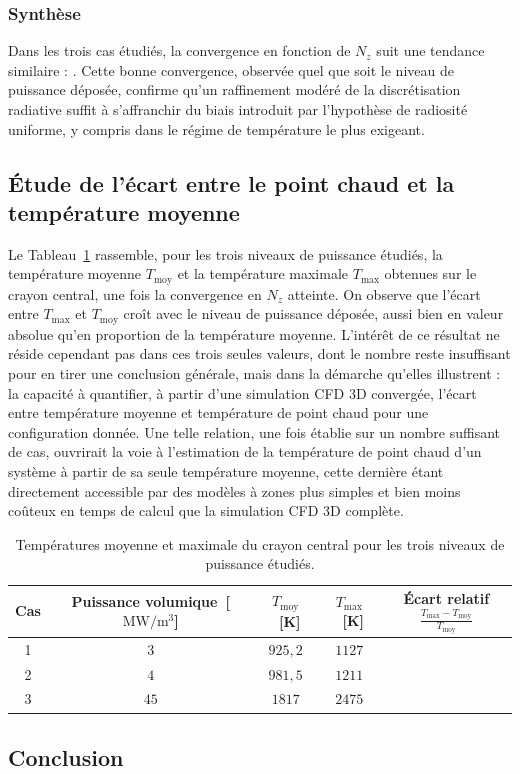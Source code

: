 \subsubsection*{Synthèse}

Dans les trois cas étudiés, la convergence en fonction de $N_z$ suit une tendance similaire : . Cette bonne convergence, observée quel que soit le niveau de puissance déposée, confirme qu'un raffinement modéré de la discrétisation radiative suffit à s'affranchir du biais introduit par l'hypothèse de radiosité uniforme, y compris dans le régime de température le plus exigeant.

\subsection{Étude de l'écart entre le point chaud et la température moyenne}

Le Tableau~\ref{tab:tmoy_tmax} rassemble, pour les trois niveaux de puissance étudiés, la température moyenne $T_{\mathrm{moy}}$ et la température maximale $T_{\mathrm{max}}$ obtenues sur le crayon central, une fois la convergence en $N_z$ atteinte. On observe que l'écart entre $T_{\mathrm{max}}$ et $T_{\mathrm{moy}}$ croît avec le niveau de puissance déposée, aussi bien en valeur absolue qu'en proportion de la température moyenne. L'intérêt de ce résultat ne réside cependant pas dans ces trois seules valeurs, dont le nombre reste insuffisant pour en tirer une conclusion générale, mais dans la démarche qu'elles illustrent : la capacité à quantifier, à partir d'une simulation CFD 3D convergée, l'écart entre température moyenne et température de point chaud pour une configuration donnée. Une telle relation, une fois établie sur un nombre suffisant de cas, ouvrirait la voie à l'estimation de la température de point chaud d'un système à partir de sa seule température moyenne, cette dernière étant directement accessible par des modèles à zones plus simples et bien moins coûteux en temps de calcul que la simulation CFD 3D complète.

\begin{table}[H]
\centering
\begin{tabular}{ccccc}
\toprule
Cas & Puissance volumique~[$\mathrm{MW/m^3}$] & $T_{\mathrm{moy}}$~[K] & $T_{\mathrm{max}}$~[K] & Écart relatif $\frac{T_{\mathrm{max}} - T_{\mathrm{moy}}}{T_{\mathrm{moy}}}$ \\
\midrule
1 & $3$  & $925{,}2$ & $1127$ & \red{...} \\
2 & $4$  & $981{,}5$ & $1211$ & \red{...} \\
3 & $45$ & $1817$    & $2475$ & \red{...} \\
\bottomrule
\end{tabular}
\caption{Températures moyenne et maximale du crayon central pour les trois niveaux de puissance étudiés.}
\label{tab:tmoy_tmax}
\end{table}

\subsection{Conclusion}
